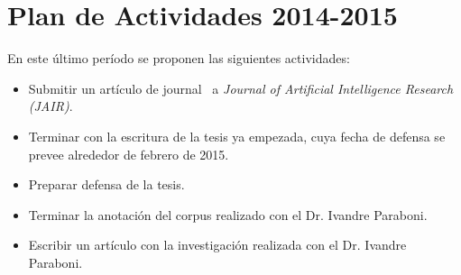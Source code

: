 \section{Plan de Actividades 2014-2015}
\label{plandetrabajo}

En este \'ultimo per\'iodo se proponen las siguientes actividades:

\begin{itemize}

\item Submitir un art\'iculo de journal~\cite{benotti-altamirano-jair} a \emph{Journal of Artificial Intelligence Research (JAIR)}.
\item Terminar con la escritura de la tesis ya empezada, cuya fecha de defensa se prevee alrededor de febrero de 2015.
\item Preparar defensa de la tesis.
\item Terminar la anotaci\'on del corpus realizado con el Dr. Ivandre Paraboni.
\item Escribir un art\'iculo con la investigaci\'on realizada con el Dr. Ivandre Paraboni.

\end{itemize}

